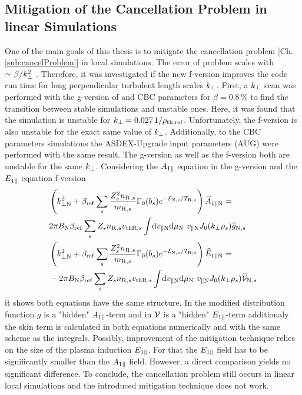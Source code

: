 
\subsection{Mitigation of the Cancellation Problem in linear Simulations}
\label{sub:mitigationLinearFVersion}

One of the main goals of this thesis is to mitigate the cancellation problem [Ch. \ref{sub:cancelProblem}] in local simulations. The error of problem scales with $\sim \beta/k_\perp^2$ \cite{Mishchenko2017}. Therefore, it was investigated if the new f-version improves the code run time for long perpendicular turbulent length scales $k_\perp$. First, a $k_\perp$ scan was performed with the g-version of {\gkw} and CBC parameters for $\beta = 0.8\,\%$ to find the transition between stable simulations and unstable ones. Here, it was found that the simulation is unstable for $k_\perp = 0.027\,1/\rho_{\mathrm{th},\mathrm{ref}}$. Unfortunately, the f-version is also unstable for the exact same value of $k_\perp$. Additionally, to the CBC parameters simulations the ASDEX-Upgrade input parameters (AUG) were performed with the same result. The g-version as well as the f-version both are unstable for the same $k_\perp$. Considering the $A_{1\parallel}$ equation in the g-version and the $E_{1\parallel}$ equation f-version
\begin{gather}
    \begin{aligned}
        &\left(k_{\perp \mathrm{N}}^2 + \beta_\mathrm{ref} \sum_s \frac{Z^2_sn_{\mathrm{R},s}}{m_{\mathrm{R},s}} \Gamma_0(b_s) e^{-\mathcal{E}_{\mathrm{N},s}/T_{\mathrm{R},s}} \right) \widehat{A}_{1\parallel \mathrm{N}} = \\
        & 2\pi B_\mathrm{N} \beta_\mathrm{ref} \sum_s Z_s n_{\mathrm{R},s} v_{\mathrm{th}\mathrm{R},s} \int \! \mathrm{d}v_{\parallel \mathrm{N}} \mathrm{d}\mu_\mathrm{N} ~ v_{\parallel \mathrm{N}} J_0(k_\perp \rho_s) \widehat{g}_{\mathrm{N},s}\\
        &\left(k_{\perp \mathrm{N}}^2 + \beta_\mathrm{ref} \sum_s \frac{Z^2_sn_{\mathrm{R},s}}{m_{\mathrm{R},s}} \Gamma_0(b_s) e^{-\mathcal{E}_{\mathrm{N},s}/T_{\mathrm{R},s}} \right) \widehat{E}_{1\parallel \mathrm{N}} = \\
        &- 2\pi B_\mathrm{N} \beta_\mathrm{ref} \sum_s Z_s n_{\mathrm{R},s} v_{\mathrm{th}\mathrm{R},s} \int \! \mathrm{d}v_{\parallel \mathrm{N}} \mathrm{d}\mu_\mathrm{N} ~ v_{\parallel \mathrm{N}} J_0(k_\perp \rho_s) \widehat{\mathcal{V}}_{\mathrm{N},s}
    \end{aligned}
    \label{eq:compareAparEpar}
\end{gather}
it shows both equations have the same structure. In the modified distribution function $g$ is a "hidden" $A_{1\parallel}$-term and in $\mathcal{V}$ is a "hidden" $E_{1\parallel}$-term additionaly the skin term is calculated in both equations numerically and with the same scheme as the integrals. Possibly, improvement of the mitigation technique relies on the size of the plasma induction $E_{1\parallel}$. For that the $E_{1\parallel}$ field has to be significantly smaller than the $A_{1\parallel}$ field. However, a direct comparison yields no significant difference. To conclude, the cancellation problem still occurs in linear local simulations and the introduced mitigation technique does not work.

